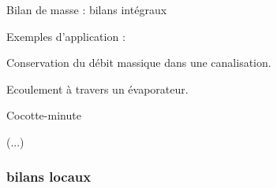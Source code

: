 \begin{frame}{Bilan de masse : bilans intégraux}
\pause
\medskip

\textcolor{vert}{Exemples d'application :}

\pause

Conservation du débit massique dans une canalisation.

Ecoulement à travers un évaporateur.

Cocotte-minute

(...)



\vspace{0mm}

\end{frame}

\subsubsection{bilans locaux}
